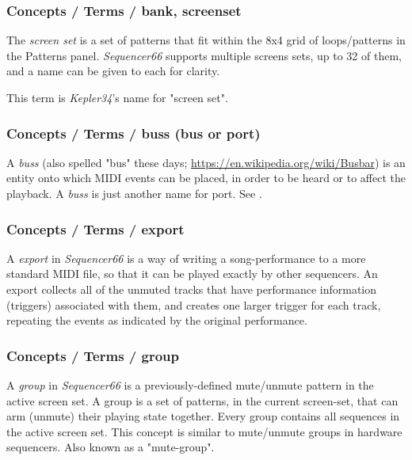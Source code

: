 \subsubsection{Concepts / Terms / bank, screenset}
\label{subsubsec:concepts_terms_bank}

   The \textsl{screen set}
   is a set of patterns that fit within the 8x4 grid of loops/patterns in the
   Patterns panel.
   \textsl{Sequencer66} supports multiple screens sets, up to 32 of them,
   and a name can be given to each for clarity.

   This term is \textsl{Kepler34}'s name for "screen set".

\subsubsection{Concepts / Terms / buss (bus or port)}
\label{subsubsec:concepts_terms_buss}

   A \textsl{buss} (also spelled "bus" these days;
   \url{https://en.wikipedia.org/wiki/Busbar}) is an entity onto which
   MIDI events can be placed, in order to be heard or to affect the
   playback.
   A \textsl{buss} is just another name for port.
   See .

\subsubsection{Concepts / Terms / export}
\label{subsubsec:concepts_terms_export}

   A \textsl{export} in \textsl{Sequencer66} is a way of writing a
   song-performance to a more standard MIDI file, so that it can be played
   exactly by other sequencers.
   An export collects all of the unmuted tracks that have
   performance information (triggers) associated with them, and creates one
   larger trigger for each track, repeating the events as indicated by the
   original performance.

\subsubsection{Concepts / Terms / group}
\label{subsubsec:concepts_terms_group}

   A \textsl{group} in \textsl{Sequencer66} is a
   previously-defined mute/unmute pattern in the active screen set.
   A group is a set of patterns, in the current screen-set,
   that can arm (unmute) their playing state
   together.  Every group contains all sequences in the active screen
   set.  This concept is similar to mute/unmute groups in hardware
   sequencers.
   Also known as a "mute-group".


